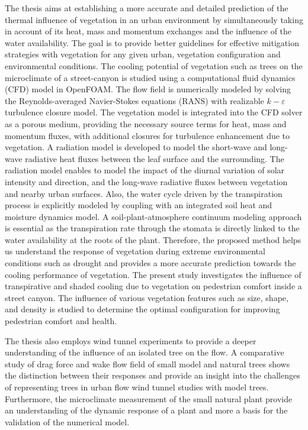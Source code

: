 The thesis aims at establishing a more accurate and detailed prediction of the thermal influence of vegetation in an urban environment by simultaneously taking in account of its heat, mass and momentum exchanges and the influence of the water availability. The goal is to provide better guidelines for effective mitigation strategies with vegetation for any given urban, vegetation configuration and environmental conditions. The cooling potential of vegetation such as trees on the microclimate of a street-canyon is studied using a computational fluid dynamics (CFD) model in OpenFOAM. The flow field is numerically modeled by solving the Reynolds-averaged Navier-Stokes equations (RANS) with realizable $k-\varepsilon$ turbulence closure model. The vegetation model is integrated into the CFD solver as a porous medium, providing the necessary source terms for heat, mass and momentum fluxes, with additional closures for turbulence enhancement due to vegetation. A radiation model is developed to model the short-wave and long-wave radiative heat fluxes between the leaf surface and the surrounding. The radiation model enables to model the impact of the diurnal variation of solar intensity and direction, and the long-wave radiative fluxes between vegetation and nearby urban surfaces. Also, the water cycle driven by the transpiration process is explicitly modeled by coupling with an integrated soil heat and moisture dynamics model. A soil-plant-atmosphere continuum modeling approach is essential as the transpiration rate through the stomata is directly linked to the water availability at the roots of the plant. Therefore, the proposed method helps us understand the response of vegetation during extreme environmental conditions such as drought and provides a more accurate prediction towards the cooling performance of vegetation. The present study investigates the influence of transpirative and shaded cooling due to vegetation on pedestrian comfort inside a street canyon. The influence of various vegetation features such as size, shape, and density is studied to determine the optimal configuration for improving pedestrian comfort and health. 

The thesis also employs wind tunnel experiments to provide a deeper understanding of the influence of an isolated tree on the flow. A comparative study of drag force and wake flow field of small model and natural trees shows the distinction between their responses and provide an insight into the challenges of representing trees in urban flow wind tunnel studies with model trees. Furthermore, the microclimate measurement of the small natural plant provide an understanding of the dynamic response of a plant and more a basis for the validation of the numerical model.

